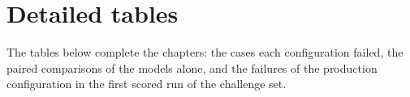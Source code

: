 \chapter{Detailed tables}\label{app:tables}

The tables below complete the chapters: the cases each configuration failed, the paired comparisons of the models
alone, and the failures of the production configuration in the first scored run of the challenge set.



